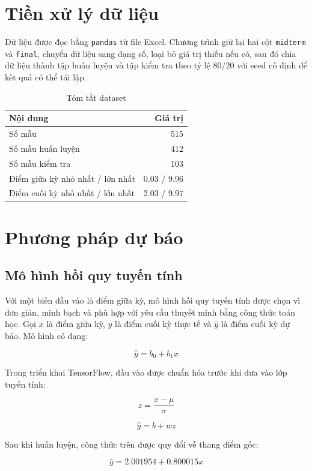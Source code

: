 \documentclass[12pt,a4paper]{article}
\begin{document}
\section{Tiền xử lý dữ liệu}
Dữ liệu được đọc bằng \texttt{pandas} từ file Excel. Chương trình giữ lại hai cột \texttt{midterm} và \texttt{final}, chuyển dữ liệu sang dạng số, loại bỏ giá trị thiếu nếu có, sau đó chia dữ liệu thành tập huấn luyện và tập kiểm tra theo tỷ lệ 80/20 với seed cố định để kết quả có thể tái lập.

\begin{table}[H]
    \centering
    \caption{Tóm tắt dataset}
    \begin{tabular}{lr}
        \toprule
        Nội dung & Giá trị \\
        \midrule
        Số mẫu & 515 \\
        Số mẫu huấn luyện & 412 \\
        Số mẫu kiểm tra & 103 \\
        Điểm giữa kỳ nhỏ nhất / lớn nhất & 0.03 / 9.96 \\
        Điểm cuối kỳ nhỏ nhất / lớn nhất & 2.03 / 9.97 \\
        \bottomrule
    \end{tabular}
\end{table}

\section{Phương pháp dự báo}
\subsection{Mô hình hồi quy tuyến tính}
Với một biến đầu vào là điểm giữa kỳ, mô hình hồi quy tuyến tính được chọn vì đơn giản, minh bạch và phù hợp với yêu cầu thuyết minh bằng công thức toán học.
Gọi \(x\) là điểm giữa kỳ, \(y\) là điểm cuối kỳ thực tế và \(\hat{y}\) là điểm cuối kỳ dự báo.
Mô hình có dạng:

\[
    \hat{y} = b_0 + b_1x
\]

Trong triển khai TensorFlow, đầu vào được chuẩn hóa trước khi đưa vào lớp tuyến tính:

\[
    z = \frac{x - \mu}{\sigma}
\]

\[
    \hat{y} = b + wz
\]

Sau khi huấn luyện, công thức trên được quy đổi về thang điểm gốc:

\[
    \hat{y} = 2.001954 + 0.800015x
\]
\end{document}
